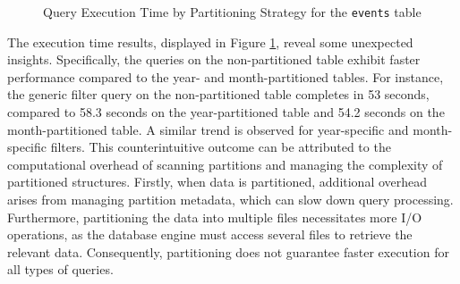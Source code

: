 \begin{figure}[h!]
    \centering
    \caption{Query Execution Time by Partitioning Strategy for the \texttt{events} table}
    \label{fig:eventsex}
\end{figure}

The execution time results, displayed in Figure \ref{fig:eventsex}, reveal some unexpected insights. Specifically, the queries on the non-partitioned table exhibit faster performance compared to the year- and month-partitioned tables. For instance, the generic filter query on the non-partitioned table completes in 53 seconds, compared to 58.3 seconds on the year-partitioned table and 54.2 seconds on the month-partitioned table. A similar trend is observed for year-specific and month-specific filters. This counterintuitive outcome can be attributed to the computational overhead of scanning partitions and managing the complexity of partitioned structures. Firstly, when data is partitioned, additional overhead arises from managing partition metadata, which can slow down query processing. Furthermore, partitioning the data into multiple files necessitates more \ac{I/O} operations, as the database engine must access several files to retrieve the relevant data. Consequently, partitioning does not guarantee faster execution for all types of queries.

